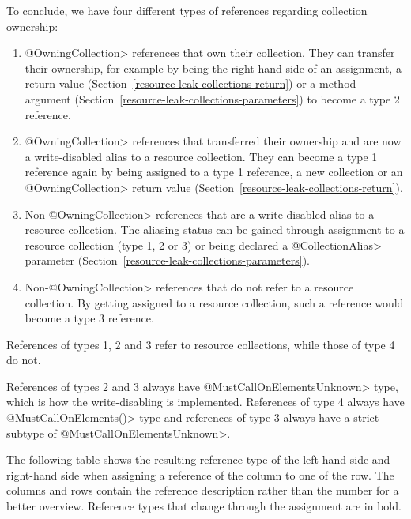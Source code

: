 To conclude, we have four different types of references regarding collection ownership:
\begin{enumerate}
  \item \<@OwningCollection> references that own their collection. They can transfer their ownership, for example by being the right-hand side of an assignment, a return value (Section~\ref{resource-leak-collections-return}) or a method argument (Section~\ref{resource-leak-collections-parameters}) to become a type 2 reference.
  \item \<@OwningCollection> references that transferred their ownership and are now a write-disabled alias to a resource collection. They can become a type 1 reference again by being assigned to a type 1 reference, a new collection or an \<@OwningCollection> return value (Section~\ref{resource-leak-collections-return}).
  \item Non-\<@OwningCollection> references that are a write-disabled alias to a resource collection. The aliasing status can be gained through assignment to a resource collection (type 1, 2 or 3) or being declared a \<@CollectionAlias> parameter (Section~\ref{resource-leak-collections-parameters}).
  \item Non-\<@OwningCollection> references that do not refer to a resource collection. By getting assigned to a resource collection, such a reference would become a type 3 reference.
\end{enumerate}

\noindent References of types 1, 2 and 3 refer to resource collections, while those of type 4 do not.

\noindent References of types 2 and 3 always have \<@MustCallOnElementsUnknown> type, which is how the write-disabling is implemented. References of type 4 always have \<@MustCallOnElements({})> type and references of type 3 always have a strict subtype of \<@MustCallOnElementsUnknown>.

The following table shows the resulting reference type of the left-hand side and right-hand side when assigning a reference of the column to one of the row. The columns and rows contain the reference description rather than the number for a better overview. Reference types that change through the assignment are in bold.

